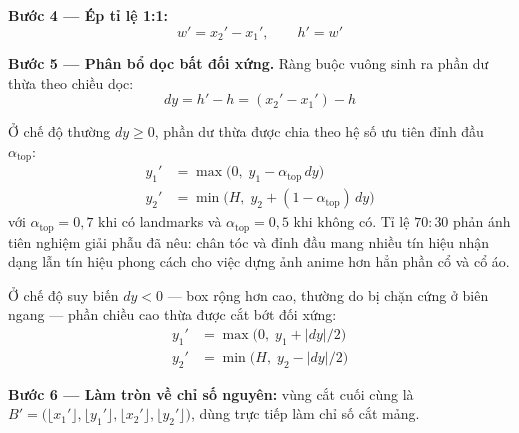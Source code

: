 \textbf{Bước 4 --- Ép tỉ lệ 1:1:}
\begin{equation}
\label{eq:margin_step4}
w' = x_2' - x_1', \qquad h' = w'
\end{equation}

\textbf{Bước 5 --- Phân bổ dọc bất đối xứng.} Ràng buộc vuông sinh ra phần dư thừa theo chiều dọc:
\begin{equation}
\label{eq:margin_step5}
dy = h' - h = (x_2' - x_1') - h
\end{equation}

Ở chế độ thường $dy \geq 0$, phần dư thừa được chia theo hệ số ưu tiên đỉnh đầu $\alpha_{\text{top}}$:
\begin{align}
\label{eq:margin_step5b}
y_1' &= \max\big(0,\; y_1 - \alpha_{\text{top}}\, dy\big) \\
y_2' &= \min\big(H,\; y_2 + (1 - \alpha_{\text{top}})\, dy\big)
\end{align}
với $\alpha_{\text{top}} = 0{,}7$ khi có landmarks và $\alpha_{\text{top}} = 0{,}5$ khi không có. Tỉ lệ $70{:}30$ phản ánh tiên nghiệm giải phẫu đã nêu: chân tóc và đỉnh đầu mang nhiều tín hiệu nhận dạng lẫn tín hiệu phong cách cho việc dựng ảnh anime hơn hẳn phần cổ và cổ áo.

Ở chế độ suy biến $dy < 0$ --- box rộng hơn cao, thường do bị chặn cứng ở biên ngang --- phần chiều cao thừa được cắt bớt đối xứng:
\begin{align}
\label{eq:margin_step5d}
y_1' &= \max\big(0,\; y_1 + |dy|/2\big) \\
y_2' &= \min\big(H,\; y_2 - |dy|/2\big)
\end{align}

\textbf{Bước 6 --- Làm tròn về chỉ số nguyên:} vùng cắt cuối cùng là $B' = \big(\lfloor x_1' \rfloor, \lfloor y_1' \rfloor, \lfloor x_2' \rfloor, \lfloor y_2' \rfloor\big)$, dùng trực tiếp làm chỉ số cắt mảng.

